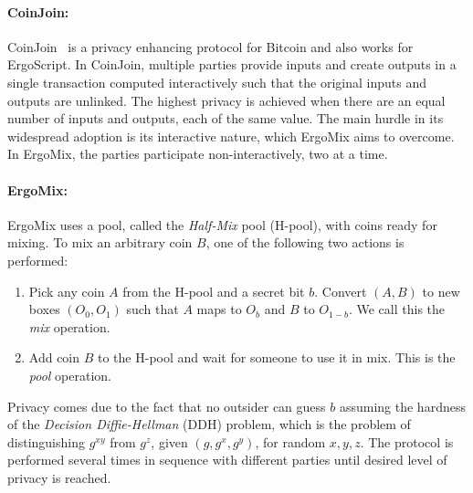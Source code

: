 \documentclass[11pt]{article}
\newcommand{\langname}{ErgoScript\xspace}
\newcommand{\mixname}{ErgoMix\xspace}
\begin{document}
\paragraph{CoinJoin:} CoinJoin~\cite{coinjoin} is a privacy enhancing protocol for Bitcoin and also works for \langname. In CoinJoin, multiple parties provide inputs and create outputs in a single transaction computed interactively such that the original inputs and outputs are unlinked. 
The highest privacy is achieved when there are an equal number of inputs and outputs, each of the same value. 
The main hurdle in its widespread adoption is its interactive nature, which \mixname aims to overcome. In \mixname, the parties participate non-interactively, two at a time.   


\paragraph{\mixname:}  
\mixname uses a pool, called the {\em Half-Mix} pool (H-pool), with coins ready for mixing. 
To mix an arbitrary coin $B$, one of the following two actions is performed:
\begin{enumerate}
	\item Pick any coin $A$ from the H-pool and a secret bit $b$. Convert $(A, B)$ to new boxes $(O_0, O_1)$ such that $A$ maps to $O_b$ and $B$ to $O_{1-b}$. 
	We call this the {\em mix} operation. 
	\item Add coin $B$ to the H-pool and wait for someone to use it in mix. This is the {\em pool} operation.
\end{enumerate}

Privacy comes due to the fact that no outsider can guess $b$ assuming the hardness of the {\em Decision Diffie-Hellman} (DDH) problem,  which is the problem of distinguishing $g^{xy}$ from $g^z$, given $(g, g^x, g^y)$, for random $x, y, z$. The protocol is performed several times in sequence with different parties until desired level of privacy is reached.  
\end{document}
